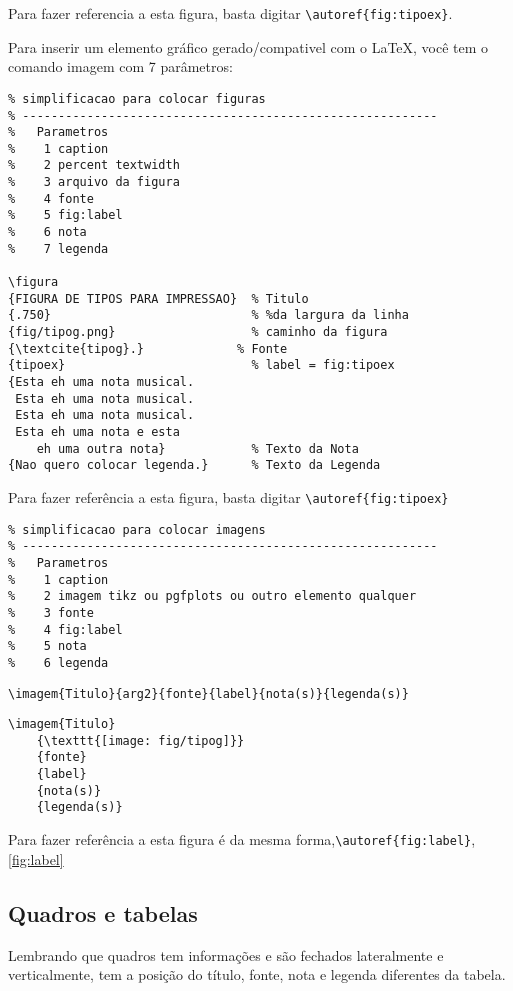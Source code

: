 Para fazer referencia a esta figura, basta digitar \verb+\autoref{fig:tipoex}+.

Para inserir um elemento gráfico gerado/compativel com o LaTeX, você tem o comando imagem com 7 parâmetros:

\begin{lstlisting}
% simplificacao para colocar figuras
% ----------------------------------------------------------
%   Parametros
%    1 caption
%    2 percent textwidth
%    3 arquivo da figura
%    4 fonte
%    5 fig:label
%    6 nota
%    7 legenda

\figura
{FIGURA DE TIPOS PARA IMPRESSAO}  % Titulo
{.750}                            % %da largura da linha
{fig/tipog.png}                   % caminho da figura
{\textcite{tipog}.}             % Fonte
{tipoex}                          % label = fig:tipoex
{Esta eh uma nota musical. 
 Esta eh uma nota musical.
 Esta eh uma nota musical. 
 Esta eh uma nota e esta 
	eh uma outra nota}            % Texto da Nota
{Nao quero colocar legenda.}      % Texto da Legenda
\end{lstlisting}

Para fazer referência a esta figura, basta digitar \verb+\autoref{fig:tipoex}+

\begin{lstlisting}
% simplificacao para colocar imagens
% ----------------------------------------------------------
%   Parametros
%    1 caption
%    2 imagem tikz ou pgfplots ou outro elemento qualquer
%    3 fonte
%    4 fig:label
%    5 nota
%    6 legenda
\end{lstlisting}

\verb+\imagem{Titulo}{arg2}{fonte}{label}{nota(s)}{legenda(s)}+

\begin{lstlisting}
\imagem{Titulo}
	{\texttt{[image: fig/tipog]}}
	{fonte}
	{label}
	{nota(s)}
	{legenda(s)}
\end{lstlisting}



Para fazer referência a esta figura é da mesma forma,\verb+\autoref{fig:label}+, \autoref{fig:label}

\subsection[Quadros e tabelas]{Quadros e tabelas}

Lembrando que quadros tem informações e são fechados lateralmente e verticalmente, tem a posição do título, fonte, nota e legenda diferentes da tabela.
